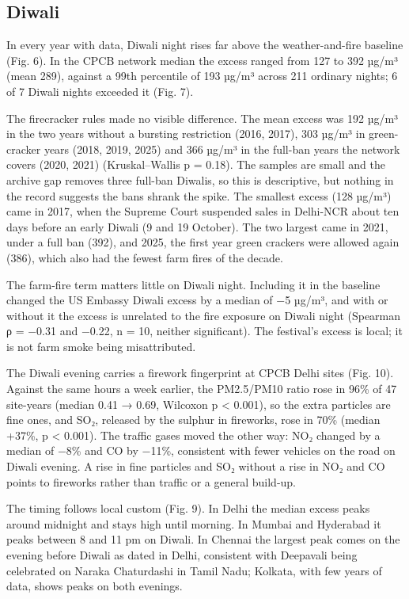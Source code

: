 \documentclass[
  11pt,
]{article}
\begin{document}
\subsection{Diwali}\label{diwali}

In every year with data, Diwali night rises far above the
weather-and-fire baseline (Fig. 6). In the CPCB network median the
excess ranged from 127 to 392 µg/m³ (mean 289), against a 99th
percentile of 193 µg/m³ across 211 ordinary nights; 6 of 7 Diwali nights
exceeded it (Fig. 7).

The firecracker rules made no visible difference. The mean excess was
192 µg/m³ in the two years without a bursting restriction (2016, 2017),
303 µg/m³ in green-cracker years (2018, 2019, 2025) and 366 µg/m³ in the
full-ban years the network covers (2020, 2021) (Kruskal--Wallis p =
0.18). The samples are small and the archive gap removes three full-ban
Diwalis, so this is descriptive, but nothing in the record suggests the
bans shrank the spike. The smallest excess (128 µg/m³) came in 2017,
when the Supreme Court suspended sales in Delhi-NCR about ten days
before an early Diwali (9 and 19 October). The two largest came in 2021,
under a full ban (392), and 2025, the first year green crackers were
allowed again (386), which also had the fewest farm fires of the decade.

The farm-fire term matters little on Diwali night. Including it in the
baseline changed the US Embassy Diwali excess by a median of −5 µg/m³,
and with or without it the excess is unrelated to the fire exposure on
Diwali night (Spearman ρ = −0.31 and −0.22, n = 10, neither
significant). The festival's excess is local; it is not farm smoke being
misattributed.

The Diwali evening carries a firework fingerprint at CPCB Delhi sites
(Fig. 10). Against the same hours a week earlier, the PM2.5/PM10 ratio
rose in 96\% of 47 site-years (median 0.41 → 0.69, Wilcoxon p
\textless{} 0.001), so the extra particles are fine ones, and SO₂,
released by the sulphur in fireworks, rose in 70\% (median +37\%, p
\textless{} 0.001). The traffic gases moved the other way: NO₂ changed
by a median of −8\% and CO by −11\%, consistent with fewer vehicles on
the road on Diwali evening. A rise in fine particles and SO₂ without a
rise in NO₂ and CO points to fireworks rather than traffic or a general
build-up.

The timing follows local custom (Fig. 9). In Delhi the median excess
peaks around midnight and stays high until morning. In Mumbai and
Hyderabad it peaks between 8 and 11 pm on Diwali. In Chennai the largest
peak comes on the evening before Diwali as dated in Delhi, consistent
with Deepavali being celebrated on Naraka Chaturdashi in Tamil Nadu;
Kolkata, with few years of data, shows peaks on both evenings.
\end{document}
